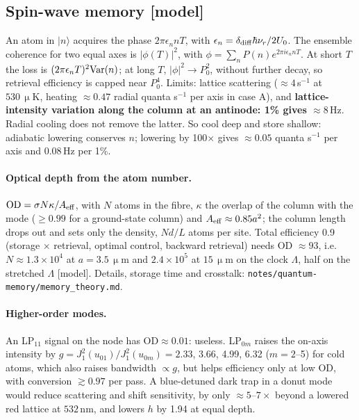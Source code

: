 \documentclass[11pt,a4paper]{article}
\newcommand{\micro}{\upmu}\newcommand{\metre}{m}\newcommand{\kelvin}{K}
\newcommand{\micrometre}{\upmu m}\newcommand{\microkelvin}{\upmu K}
\newcommand{\SI}[2]{\ensuremath{#1\,\mathrm{#2}}}
\newcommand{\ket}[1]{|#1\rangle}
\begin{document}
\subsection{Spin-wave memory [model]}
\hypertarget{d:memory}{}
An atom in $\ket n$ acquires the phase $2\pi\epsilon_nnT$, with $\epsilon_n=\delta_{\rm diff}\hbar\nu_r/2U_0$. The ensemble coherence for two equal axes is $|\phi(T)|^2$, with $\phi=\sum_nP(n)e^{2\pi i\epsilon_nnT}$. At short $T$ the loss is $(2\pi\epsilon_nT)^2{\rm Var}(n)$; at long $T$, $|\phi|^2\to P_0^2$, without further decay, so retrieval efficiency is capped near $P_0^4$. Limits: lattice scattering ($\approx4\,$s$^{-1}$ at \SI{530}{\micro K}, heating $\approx0.47$ radial quanta s$^{-1}$ per axis in case A), and \textbf{lattice-intensity variation along the column at an antinode: 1\% gives $\approx\SI{8}{Hz}$}. Radial cooling does not remove the latter. So cool deep and store shallow: adiabatic lowering conserves $n$; lowering by 100$\times$ gives $\approx0.05$ quanta s$^{-1}$ per axis and \SI{0.08}{Hz} per 1\%.

\paragraph{Optical depth from the atom number.} ${\rm OD}=\sigma N\kappa/A_{\rm eff}$, with $N$ atoms in the fibre, $\kappa$ the overlap of the column with the mode ($\ge0.99$ for a ground-state column) and $A_{\rm eff}\approx0.85a^2$; the column length drops out and sets only the density, $Nd/L$ atoms per site. Total efficiency 0.9 (storage $\times$ retrieval, optimal control, backward retrieval) needs OD $\approx93$, i.e.\ $N\approx1.3\times10^4$ at $a=\SI{3.5}{\micrometre}$ and $2.4\times10^5$ at \SI{15}{\micrometre} on the clock $\Lambda$, half on the stretched $\Lambda$ [model]. Details, storage time and crosstalk: \texttt{notes/quantum-memory/memory\_theory.md}.

\paragraph{Higher-order modes.} An LP$_{11}$ signal on the node has $\text{OD}\approx0.01$: useless. LP$_{0m}$ raises the on-axis intensity by $g=J_1^2(u_{01})/J_1^2(u_{0m})=2.33$, 3.66, 4.99, 6.32 ($m=2$--5) for cold atoms, which also raises bandwidth $\propto g$, but helps efficiency only at low OD, with conversion $\gtrsim0.97$ per pass. A blue-detuned dark trap in a donut mode would reduce scattering and shift sensitivity, by only $\approx5$--$7\times$ beyond a lowered red lattice at \SI{532}{nm}, and lowers $h$ by 1.94 at equal depth.
\end{document}
